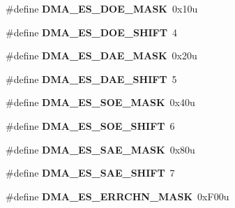 \begin{DoxyCompactItemize}
\item 
\#define {\bfseries D\+M\+A\+\_\+\+E\+S\+\_\+\+D\+O\+E\+\_\+\+M\+A\+SK}~0x10u\hypertarget{group__DMA__Register__Masks_ga6a38a57d5f7381fe6e65cad9564311a3}{}\label{group__DMA__Register__Masks_ga6a38a57d5f7381fe6e65cad9564311a3}

\item 
\#define {\bfseries D\+M\+A\+\_\+\+E\+S\+\_\+\+D\+O\+E\+\_\+\+S\+H\+I\+FT}~4\hypertarget{group__DMA__Register__Masks_gaa9853f8e3fc7f440fcfc0b1f098ffecc}{}\label{group__DMA__Register__Masks_gaa9853f8e3fc7f440fcfc0b1f098ffecc}

\item 
\#define {\bfseries D\+M\+A\+\_\+\+E\+S\+\_\+\+D\+A\+E\+\_\+\+M\+A\+SK}~0x20u\hypertarget{group__DMA__Register__Masks_ga62debcb73cec6b330300520172723ff6}{}\label{group__DMA__Register__Masks_ga62debcb73cec6b330300520172723ff6}

\item 
\#define {\bfseries D\+M\+A\+\_\+\+E\+S\+\_\+\+D\+A\+E\+\_\+\+S\+H\+I\+FT}~5\hypertarget{group__DMA__Register__Masks_ga13c3980b6560b52840cd338f4970966f}{}\label{group__DMA__Register__Masks_ga13c3980b6560b52840cd338f4970966f}

\item 
\#define {\bfseries D\+M\+A\+\_\+\+E\+S\+\_\+\+S\+O\+E\+\_\+\+M\+A\+SK}~0x40u\hypertarget{group__DMA__Register__Masks_gad2b80aca760f9cbb20c913eac38db2c7}{}\label{group__DMA__Register__Masks_gad2b80aca760f9cbb20c913eac38db2c7}

\item 
\#define {\bfseries D\+M\+A\+\_\+\+E\+S\+\_\+\+S\+O\+E\+\_\+\+S\+H\+I\+FT}~6\hypertarget{group__DMA__Register__Masks_ga3298918e14680c42e624d78d13dac2ba}{}\label{group__DMA__Register__Masks_ga3298918e14680c42e624d78d13dac2ba}

\item 
\#define {\bfseries D\+M\+A\+\_\+\+E\+S\+\_\+\+S\+A\+E\+\_\+\+M\+A\+SK}~0x80u\hypertarget{group__DMA__Register__Masks_gac5a0c75aa964d00ff152c804b9100701}{}\label{group__DMA__Register__Masks_gac5a0c75aa964d00ff152c804b9100701}

\item 
\#define {\bfseries D\+M\+A\+\_\+\+E\+S\+\_\+\+S\+A\+E\+\_\+\+S\+H\+I\+FT}~7\hypertarget{group__DMA__Register__Masks_gab8fcc55b025406188612ca7ea6fd4eb7}{}\label{group__DMA__Register__Masks_gab8fcc55b025406188612ca7ea6fd4eb7}

\item 
\#define {\bfseries D\+M\+A\+\_\+\+E\+S\+\_\+\+E\+R\+R\+C\+H\+N\+\_\+\+M\+A\+SK}~0x\+F00u\hypertarget{group__DMA__Register__Masks_ga1706839a3ec91f2cd194526d1d5fc60e}{}\label{group__DMA__Register__Masks_ga1706839a3ec91f2cd194526d1d5fc60e}


\end{DoxyCompactItemize}

